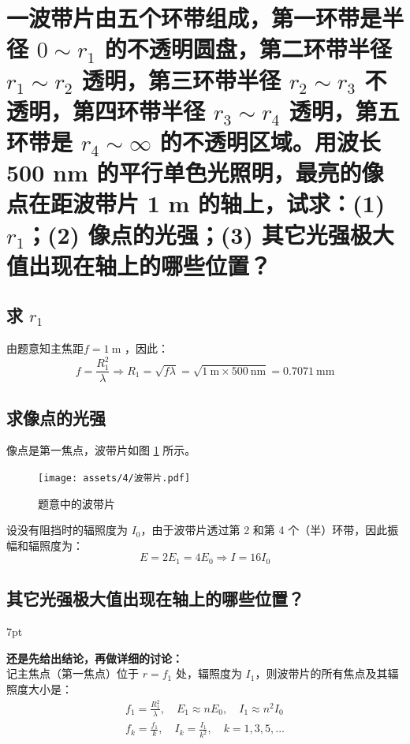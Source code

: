 \documentclass[UTF8]{report}
\theoremstyle{MyLineTheoremStyle} %
\theoremstyle{MyBlockTheoremStyle} %
\theoremstyle{MySubsubsectionStyle} %
\newenvironment{graybox}{%
        \def\FrameCommand{%
        \hspace{1pt}%
        {\color{gray}\small \vrule width 2pt}%
        {\color{graybox_color}\vrule width 4pt}%
        \colorbox{graybox_color}%
        }%
        \MakeFramed{\advance\hsize-\width\FrameRestore}%
        \noindent\hspace{-4.55pt}%
        \begin{adjustwidth}{}{7pt}%
        \vspace{2pt}\vspace{2pt}%
        }
        {%
        \vspace{2pt}\end{adjustwidth}\endMakeFramed%
        }
\begin{document}
\section{一波带片由五个环带组成，第一环带是半径 $0 \sim r_1$ 的不透明圆盘，第二环带半径 $r_1\sim r_2$ 透明，第三环带半径 $r_2\sim r_3$ 不透明，第四环带半径 $r_3\sim r_4$ 透明，第五环带是 $r_4 \sim \infty$ 的不透明区域。用波长 500 nm 的平行单色光照明，最亮的像点在距波带片 1 m 的轴上，试求：(1) $r_1$；(2) 像点的光强；(3) 其它光强极大值出现在轴上的哪些位置？}

\subsection{求 $r_1$}

由题意知主焦距$f = 1 \ \mathrm{m}$ ，因此：
\begin{equation}
f = \frac{R_1^2}{\lambda} \Longrightarrow R_1 = \sqrt{f \lambda} = \sqrt{ 1 \ \mathrm{m} \times 500 \ \mathrm{nm} } = 0.7071 \ \mathrm{mm}
\end{equation}

\subsection{求像点的光强}

像点是第一焦点，波带片如图 \ref{题意中的波带片} 所示。
\begin{figure}[H]\centering
    \texttt{[image: assets/4/波带片.pdf]}
    \caption{题意中的波带片}\label{题意中的波带片}
\end{figure}
设没有阻挡时的辐照度为 $I_0$，由于波带片透过第 2 和第 4 个（半）环带，因此振幅和辐照度为：
\begin{equation}
E = 2 E_1 = 4 E_0 \Longrightarrow I = 16 I_0
\end{equation}

\subsection{其它光强极大值出现在轴上的哪些位置？}

\begin{graybox}
\textbf{还是先给出结论，再做详细的讨论：}\\
记主焦点（第一焦点）位于 $r = f_1$ 处，辐照度为 $I_1$，则波带片的所有焦点及其辐照度大小是：
\begin{gather}
    f_1 = \frac{R_1^2}{\lambda},\quad   E_1 \approx n E_0 ,\quad   I_1 \approx n^2 I_0 \\
    f_k = \frac{f_1}{k},\quad I_k = \frac{I_1}{k^2},\quad k = 1, 3, 5, ...
\end{gather}\noindent
\end{graybox}
\end{document}
